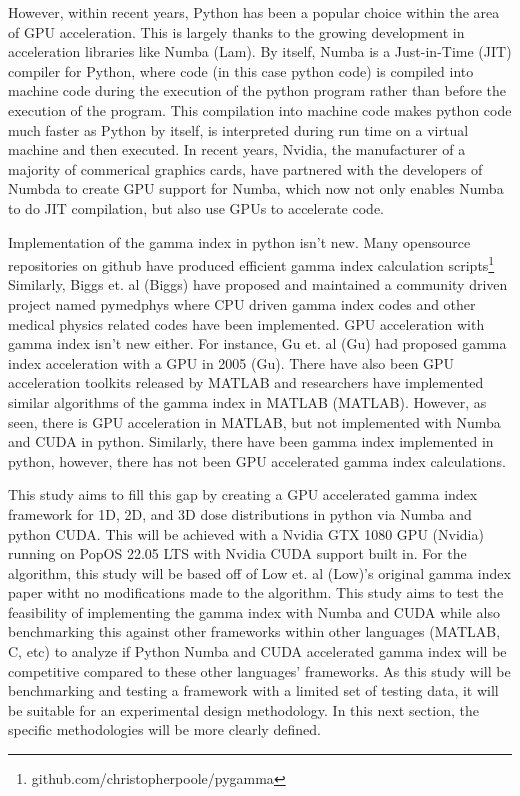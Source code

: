 \documentclass[12pt]{article}
\begin{document}
However, within recent years, Python has been a popular choice within the area of GPU acceleration. This is largely thanks to the growing development in acceleration libraries like Numba (Lam). By itself, Numba is a Just-in-Time (JIT) compiler for Python, where code (in this case python code) is compiled into machine code during the execution of the python program rather than before the execution of the program. This compilation into machine code makes python code much faster as Python by itself, is interpreted during run time on a virtual machine and then executed. In recent years, Nvidia, the manufacturer of a majority of commerical graphics cards, have partnered with the developers of Numbda to create GPU support for Numba, which now not only enables Numba to do JIT compilation, but also use GPUs to accelerate code.

Implementation of the gamma index in python isn’t new. Many opensource repositories on github have produced efficient gamma index calculation scripts\footnote[1]{github.com/christopherpoole/pygamma} Similarly, Biggs et. al (Biggs) have proposed and maintained a community driven project named pymedphys where CPU driven gamma index codes and other medical physics related codes have been implemented. GPU acceleration with gamma index isn’t new either. For instance, Gu et. al (Gu) had proposed gamma index acceleration with a GPU in 2005 (Gu). There have also been GPU acceleration toolkits released by MATLAB and researchers have implemented similar algorithms of the gamma index in MATLAB (MATLAB). However, as seen, there is GPU acceleration in MATLAB, but not implemented with Numba and CUDA in python. Similarly, there have been gamma index implemented in python, however, there has not been GPU accelerated gamma index calculations.

This study aims to fill this gap by creating a GPU accelerated gamma index framework for 1D, 2D, and 3D dose distributions in python via Numba and python CUDA. This will be achieved with a Nvidia GTX 1080 GPU (Nvidia) running on PopOS 22.05 LTS with Nvidia CUDA support built in. For the algorithm, this study will be based off of Low et. al (Low)’s original gamma index paper witht no modifications made to the algorithm. This study aims to test the feasibility of implementing the gamma index with Numba and CUDA while also benchmarking this against other frameworks within other languages (MATLAB, C, etc) to analyze if Python Numba and CUDA accelerated gamma index will be competitive compared to these other languages’ frameworks. As this study will be benchmarking and testing a framework with a limited set of testing data, it will be suitable for an experimental design methodology. In this next section, the specific methodologies will be more clearly defined.
\end{document}
